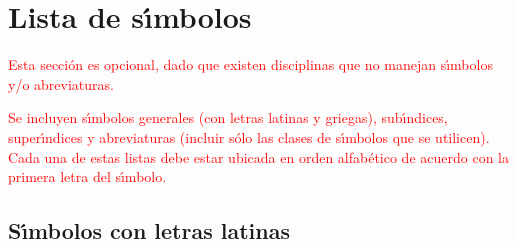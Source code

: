 \chapter*{Lista de s\'{\i}mbolos}
\textcolor{red}{
Esta secci\'{o}n es opcional, dado que existen disciplinas que no manejan s\'{\i}mbolos y/o abreviaturas.\\
}

\textcolor{red}{
Se incluyen s\'{\i}mbolos generales (con letras latinas y griegas), sub\'{\i}ndices, super\'{\i}ndices y abreviaturas (incluir s\'{o}lo las clases de s\'{\i}mbolos que se utilicen). Cada una de estas listas debe estar ubicada en orden alfab\'{e}tico de acuerdo con la primera letra del s\'{\i}mbolo.
}
\section*{S\'{\i}mbolos con letras latinas}


